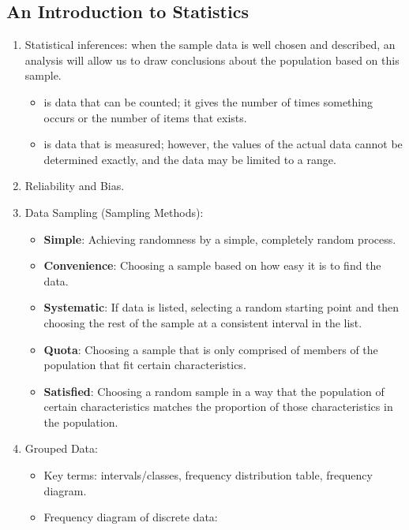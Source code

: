 \documentclass[12pt, a4paper]{article}
\begin{document}
\subsection{An Introduction to Statistics}
\begin{enumerate}
    \item Statistical inferences: when the sample data is well chosen and described, an analysis will allow us to draw conclusions about the population based on this sample. 
    \begin{itemize}
        \item \textbf{\color{red}{Discrete data}} is data that can be counted; it gives the number of times something occurs or the number of items that exists.
        \item \textbf{\color{red}{Continuous data}} is data that is measured; however, the values of the actual data cannot be determined exactly, and the data may be limited to a range.
    \end{itemize}
    \item Reliability and Bias. 
    \item Data Sampling (Sampling Methods): 
    \begin{itemize}
        \item \textbf{Simple}: Achieving randomness by a simple, completely random process.
        \item \textbf{Convenience}: Choosing a sample based on how easy it is to find the data. 
        \item \textbf{Systematic}: If data is listed, selecting a random starting point and then choosing the rest of the sample at a consistent interval in the list. 
        \item \textbf{Quota}: Choosing a sample that is only comprised of members of the population that fit certain characteristics. 
        \item \textbf{Satisfied}: Choosing a random sample in a way that the population of certain characteristics matches the proportion of those characteristics in the population. 
    \end{itemize}
    \item Grouped Data: 
    \begin{itemize}
        \item Key terms: intervals/classes, frequency distribution table, frequency diagram. 
        \item Frequency diagram of discrete data: 
        \begin{figure}[H]
            \center

\end{figure}
\end{itemize}
\end{enumerate}
\end{document}
